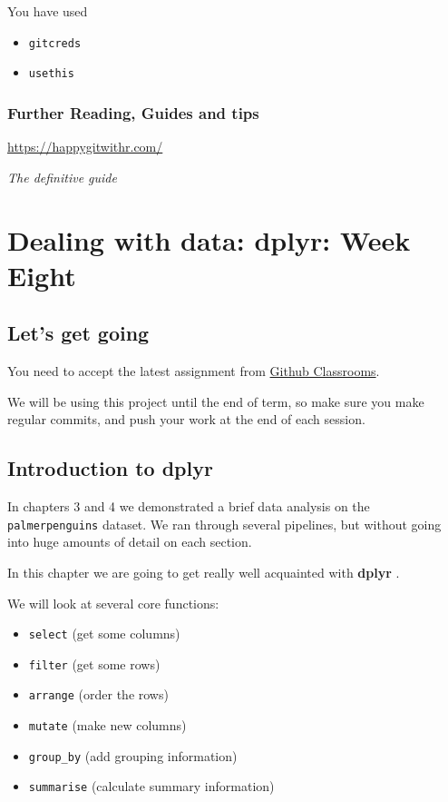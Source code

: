 \documentclass[
]{book}
\begin{document}
You have used

\begin{itemize}
\item
  \texttt{gitcreds} \citet{R-gitcreds}
\item
  \texttt{usethis} \citet{R-usethis}
\end{itemize}

\hypertarget{further-reading-guides-and-tips-2}{%
\subsection{Further Reading, Guides and tips}\label{further-reading-guides-and-tips-2}}

\citet{happygit} \url{https://happygitwithr.com/}

\emph{The definitive guide}

\hypertarget{dealing-with-data-dplyr-week-eight}{%
\chapter{Dealing with data: dplyr: Week Eight}\label{dealing-with-data-dplyr-week-eight}}

\hypertarget{lets-get-going}{%
\section{Let's get going}\label{lets-get-going}}

You need to accept the latest assignment from \href{https://classroom.github.com/a/ifsL9ZE1}{Github Classrooms}.

We will be using this project until the end of term, so make sure you make regular commits, and push your work at the end of each session.

\hypertarget{introduction-to-dplyr}{%
\section{Introduction to dplyr}\label{introduction-to-dplyr}}

In chapters 3 and 4 we demonstrated a brief data analysis on the \texttt{palmerpenguins} dataset. We ran through several pipelines, but without going into huge amounts of detail on each section.

In this chapter we are going to get really well acquainted with \textbf{dplyr} \citet{R-dplyr}.

We will look at several core functions:

\begin{itemize}
\item
  \texttt{select} (get some columns)
\item
  \texttt{filter} (get some rows)
\item
  \texttt{arrange} (order the rows)
\item
  \texttt{mutate} (make new columns)
\item
  \texttt{group\_by} (add grouping information)
\item
  \texttt{summarise} (calculate summary information)
\end{itemize}
\end{document}
